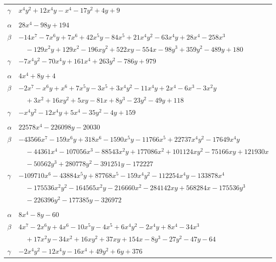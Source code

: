 \documentclass[11pt]{article}
\begin{document}
\begin{longtable}{@{}ll@{}}
$\gamma$ & $x^{4}y^{2}+12x^{4}y-x^{4}-17y^{2}+4y+9$\\
\addlinespace[3pt]
\multicolumn{2}{@{}l}{$\{i,j\}=\{16,28\}$, $k_{ij}=2^{3}\cdot 3^{5}$}\\
$\alpha$ & $28x^{4}-98y+194$\\
$\beta$ & $-14x^{7}-7x^{6}y+7x^{6}+42x^{5}y-84x^{5}+21x^{4}y^{2}-63x^{4}y+28x^{4}-258x^{3}$\\
 & $\quad -129x^{2}y+129x^{2}-196xy^{2}+522xy-554x-98y^{3}+359y^{2}-489y+180$\\
$\gamma$ & $-7x^{4}y^{2}-70x^{4}y+161x^{4}+263y^{2}-786y+979$\\
\addlinespace[3pt]
\multicolumn{2}{@{}l}{$\{i,j\}=\{16,37\}$, $k_{ij}=2^{4}\cdot 3^{3}$}\\
$\alpha$ & $4x^{4}+8y+4$\\
$\beta$ & $-2x^{7}-x^{6}y+x^{6}+7x^{5}y-3x^{5}+3x^{4}y^{2}-11x^{4}y+2x^{4}-6x^{3}-3x^{2}y$\\
 & $\quad +3x^{2}+16xy^{2}+5xy-81x+8y^{3}-23y^{2}-49y+118$\\
$\gamma$ & $-x^{4}y^{2}-12x^{4}y+5x^{4}-35y^{2}-4y+159$\\
\addlinespace[3pt]
\multicolumn{2}{@{}l}{$\{i,j\}=\{17,23\}$, $k_{ij}=2^{2}\cdot 7^{2}\cdot 13$}\\
$\alpha$ & $22578x^{4}-226098y-20030$\\
$\beta$ & $-43566x^{7}-159x^{6}y+318x^{6}-1590x^{5}y-11766x^{5}+22737x^{4}y^{2}-17649x^{4}y$\\
 & $\quad -44361x^{4}-107056x^{3}-88543x^{2}y+177086x^{2}+101124xy^{2}-75166xy+121930x$\\
 & $\quad -50562y^{3}+280778y^{2}-391251y-172227$\\
$\gamma$ & $-109710x^{6}-43884x^{5}y+87768x^{5}-159x^{4}y^{2}-112254x^{4}y-133878x^{4}$\\
 & $\quad -175536x^{2}y^{2}-164565x^{2}y-216660x^{2}-284142xy+568284x-175536y^{3}$\\
 & $\quad -226396y^{2}-177385y-326972$\\
\addlinespace[3pt]
\multicolumn{2}{@{}l}{$\{i,j\}=\{17,27\}$, $k_{ij}=2^{2}\cdot 7\cdot 11$}\\
$\alpha$ & $8x^{4}-8y-60$\\
$\beta$ & $4x^{7}-2x^{6}y+4x^{6}-10x^{5}y-4x^{5}+6x^{4}y^{2}-2x^{4}y+8x^{4}-34x^{3}$\\
 & $\quad +17x^{2}y-34x^{2}+16xy^{2}+37xy+154x-8y^{3}-27y^{2}-47y-64$\\
$\gamma$ & $-2x^{4}y^{2}-12x^{4}y-16x^{4}+49y^{2}+6y+376$\\

\end{longtable}
\end{document}
